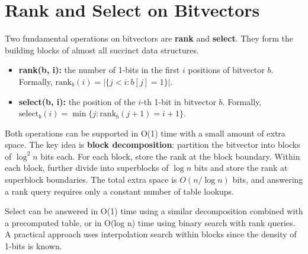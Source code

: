 \section{Rank and Select on Bitvectors}\label{sec22:rank-select}

Two fundamental operations on bitvectors are \textbf{rank} and \textbf{select}. They form the building blocks of almost all succinct data structures.

\begin{itemize}
\item \textbf{rank(b, i):} the number of 1-bits in the first $i$ positions of bitvector $b$. Formally, $\text{rank}_b(i) = |\{j < i : b[j] = 1\}|$.
\item \textbf{select(b, i):} the position of the $i$-th 1-bit in bitvector $b$. Formally, $\text{select}_b(i) = \min\{j : \text{rank}_b(j+1) = i + 1\}$.
\end{itemize}

Both operations can be supported in O(1) time with a small amount of extra space. The key idea is \textbf{block decomposition}: partition the bitvector into blocks of $\log^2 n$ bits each. For each block, store the rank at the block boundary. Within each block, further divide into superblocks of $\log n$ bits and store the rank at superblock boundaries. The total extra space is $O(n / \log n)$ bits, and answering a rank query requires only a constant number of table lookups.

Select can be answered in O(1) time using a similar decomposition combined with a precomputed table, or in O(log n) time using binary search with rank queries. A practical approach uses interpolation search within blocks since the density of 1-bits is known.

